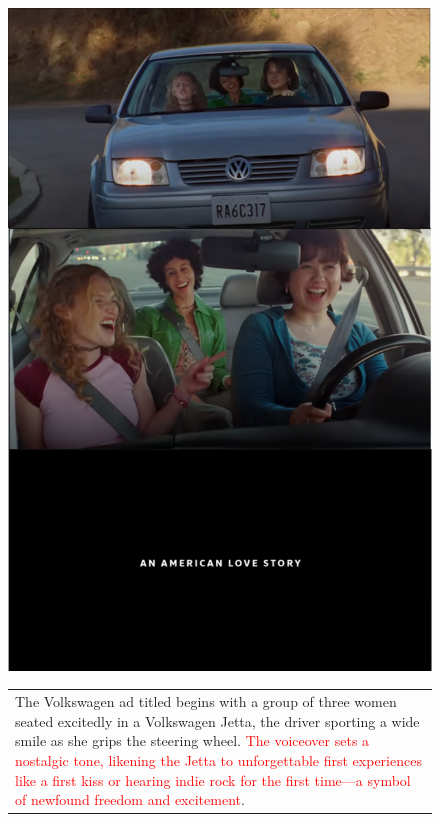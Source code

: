 





\begin{landscape}


\begin{figure}[t]
\begin{minipage}[c]{0.5\textwidth}
        \centering
        \includegraphics[width=\textwidth]{images/volswagen-video-3_compressed.pdf}
    \end{minipage}
    \begin{minipage}[c]{0.73\textwidth}
\centering
\scriptsize
\begin{tabular}{p{14cm}}\scriptsize
The Volkswagen ad titled begins with a group of three women seated excitedly in a Volkswagen Jetta, the driver sporting a wide smile as she grips the steering wheel. \textcolor{red}{The voiceover sets a nostalgic tone, likening the Jetta to unforgettable first experiences like a first kiss or hearing indie rock for the first time—a symbol of newfound freedom and excitement}.


\end{tabular}
\end{minipage}
\end{figure}
\end{landscape}
